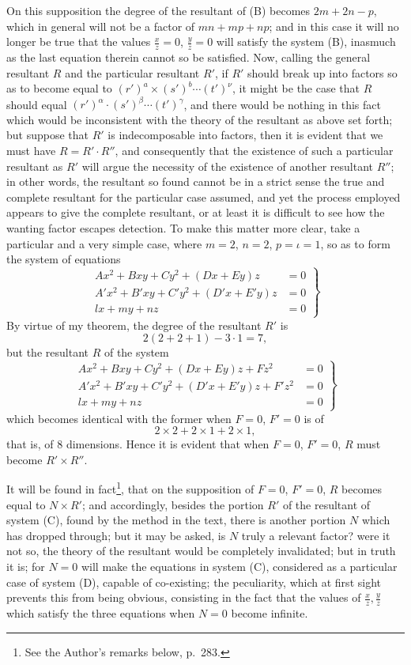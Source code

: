 \documentclass[11pt]{article}
\newcommand{\sourcepage}[1]{\marginpar{\scriptsize p.~#1}}
\begin{document}
{{On this supposition the degree of the resultant of (B) becomes $2m+2n-p$, which in general will not be a factor of $mn+mp+np$; and in this case it will no longer be true that the values $\frac{x}{z}=0$, $\frac{y}{z}=0$ will satisfy the system (B), inasmuch as the last equation therein cannot so be satisfied. Now, calling the general resultant $R$ and the particular resultant $R'$, if $R'$ should break up into factors so as to become equal to $(r')^a\times(s')^b\cdots(t')^\nu$, it might be the case that $R$ should equal $(r')^\alpha\cdot(s')^\beta\cdots(t')^\gamma$, and there would be nothing in this fact which would be inconsistent with the theory of the resultant as above set forth; but suppose that $R'$ is indecomposable into factors, then it is evident that we must have $R=R'\cdot R''$, and consequently that the existence of such a particular resultant as $R'$ will argue the necessity of the existence of another resultant $R''$; in other words, the resultant so found cannot be in a strict sense the true and complete resultant for the particular case assumed, and yet the process employed appears to give the complete resultant, or at least it is difficult to see how the wanting factor escapes detection. To make this matter more clear, take a particular and a very simple case, where $m=2$, $n=2$, $p=\iota=1$, so as to form the system of equations
\[
\left.
\begin{aligned}
Ax^2+Bxy+Cy^2+(Dx+Ey)z&=0\\
A'x^2+B'xy+C'y^2+(D'x+E'y)z&=0\\
lx+my+nz&=0
\end{aligned}
\right\}\tag{C}
\]
By virtue of my theorem, the degree of the resultant $R'$ is
\[
2(2+2+1)-3\cdot1=7,
\]
but the resultant $R$ of the system
\[
\left.
\begin{aligned}
Ax^2+Bxy+Cy^2+(Dx+Ey)z+Fz^2&=0\\
A'x^2+B'xy+C'y^2+(D'x+E'y)z+F'z^2&=0\\
lx+my+nz&=0
\end{aligned}
\right\}\tag{D}
\]
which becomes identical with the former when $F=0$, $F'=0$ is of
\[
2\times2+2\times1+2\times1,
\]
that is, of 8 dimensions. Hence it is evident that when $F=0$, $F'=0$, $R$ must become $R'\times R''$.

\sourcepage{264}
It will be found in fact\footnote{See the Author's remarks below, p.~283.}, that on the supposition of $F=0$, $F'=0$, $R$ becomes equal to $N\times R'$; and accordingly, besides the portion $R'$ of the resultant of system (C), found by the method in the text, there is another portion $N$ which has dropped through; but it may be asked, is $N$ truly a relevant factor? were it not so, the theory of the resultant would be completely invalidated; but in truth it is; for $N=0$ will make the equations in system (C), considered as a particular case of system (D), capable of co-existing; the peculiarity, which at first sight prevents this from being obvious, consisting in the fact that the values of $\frac{x}{z},\frac{y}{z}$ which satisfy the three equations when $N=0$ become infinite.

}}
\end{document}
